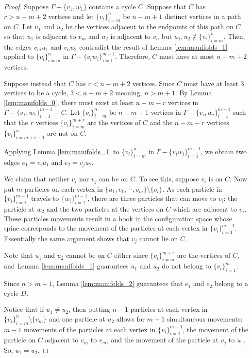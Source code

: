 \begin{proof}
Suppose \(\Gamma - \{v_1, w_1\}\) contains a cycle \(C\).
Suppose that \(C\) has \(r > n-m+2\) vertices and let \(\{v_i\}_{i=m}^n\) be \(n-m+1\) distinct vertices in a path on \(C\).
Let \(u_1\) and \(u_2\) be the vertices adjacent to the endpoints of this path on \(C\) so that
\(u_1\) is adjacent to \(v_m\) and \(u_2\) is adjacent to \(v_n\) but \(u_1, u_2 \not \in \{v_i\}_{i=m}^n\).
Then, the edges \(v_m u_1\) and \(v_n u_2\) contradict the result of 
Lemma \ref{lem:manifolds_1} applied to \(\{v_i\}_{i=m}^n\) in \(\Gamma - \{v_i w_i\}_{i=1}^{m-1}\).
Therefore, \(C\) must have at most \(n-m+2\) vertices.

Suppose instead that \(C\) has \(r < n-m+2\) vertices.  Since \(C\) must have at
least \(3\) vertices to be a cycle, \(3 < n - m + 2\) meaning, \(n > m + 1\).  By
Lemma \ref{lem:manifolds_0}, there must exist at least \(n + m - r\) vertices in
\(\Gamma - \{v_1, w_1\}_{i=1}^{m-1} - C\).  Let \(\{v_i\}_{i=m}^n\) be \(n - m +
1\) vertices in \(\Gamma - \{v_i, w_i\}_{i=1}^{m-1}\) such that the \(r\)
vertices \(\{v_i\}_{i=m}^{m+r}\) are the vertices of \(C\) and the \(n-m-r\)
vertices \(\{v_i\}_{i=m+r+1}^n\) are not on \(C\).

Applying Lemma \ref{lem:manifolds_1} to \(\{v_i\}_{i=m}^n\) in \(\Gamma - \{v_i w_i\}_{i=1}^{m-1}\), 
we obtain two edges \(e_1 = v_i u_1\) and \(e_2 = v_j u_2\).

We claim that neither \(v_i\) nor \(v_j\) can be on \(C\).
To see this, suppose \(v_i\) is on \(C\). 
Now put \(m\) particles on each vertex in \(\{u_1, v_1, \cdots, v_m\}\setminus\{v_i\}\).
As each particle in \(\{v_i\}_{i=1}^{m-1}\) travels to \(\{w_i\}_{i=1}^{m-1}\),
there are three particles that can move to \(v_i\): 
the particle at \(w_2\) and the two particles at the vertices on \(C\) which are adjacent to \(v_i\).
These particles movements result in a book in the configuration space whose
spine corresponds to the movement of the particles at each vertex in \(\{v_i\}_{i=1}^{m-1}\).
Essentially the same argument shows that \(v_j\) cannot lie on \(C\).

Note that \(u_1\) and \(u_2\) cannot be on \(C\) either since 
\(\{v_i\}_{i=m}^{m+r}\) are the vertices of \(C\),
and Lemma \ref{lem:manifolds_1} guarantees \(u_1\) and \(u_2\) do not belong to \(\{v_i\}_{i=1}^m\).

Since \(n > m + 1\), Lemma \ref{lem:manifolds_2} guarantees that \(e_1\) and \(e_2\) belong to a cycle \(D\).

Notice that if \(u_1 \neq u_2\), then putting \(n-1\) particles at each vertex in \(\{v_i\}_{i=m}^n \setminus \{v_m\}\)
and one particle at \(u_2\) allows for \(m+1\) simultaneous movements:
\(m-1\) movements of the particles at each vertex in \(\{v_i\}_{i=1}^{m-1}\),
the movement of the particle on \(C\) adjacent to \(v_m\) to \(v_m\),
and the movement of the particle at \(v_j\) to \(u_1\).
So, \(u_1 = u_2\).


\end{proof}
